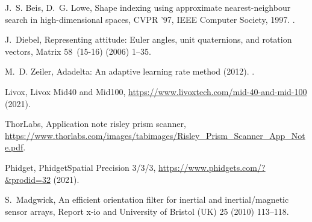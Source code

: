 \documentclass[5p]{elsarticle}
\begin{document}
\begin{thebibliography}{10}
J.~S. Beis, D.~G. Lowe, Shape indexing using approximate nearest-neighbour
  search in high-dimensional spaces, CVPR '97, IEEE Computer Society, 1997.
\newblock \href {http://dx.doi.org/10.1109/CVPR.1997.609451}
  {}.

J.~Diebel, Representing attitude: Euler angles, unit quaternions, and rotation
  vectors, Matrix 58~(15-16) (2006) 1--35.

M.~D. Zeiler, Adadelta: An adaptive learning rate method (2012).
\newblock \href {http://arxiv.org/abs/1212.5701} {}.

Livox, {Livox Mid40 and Mid100},
  \url{https://www.livoxtech.com/mid-40-and-mid-100} (2021).

ThorLabs, Application note risley prism scanner,
  \url{https://www.thorlabs.com/images/tabimages/Risley_Prism_Scanner_App_Note.pdf}.

Phidget, {PhidgetSpatial Precision 3/3/3},
  \url{https://www.phidgets.com/?&prodid=32} (2021).

S.~Madgwick, An efficient orientation filter for inertial and inertial/magnetic
  sensor arrays, Report x-io and University of Bristol (UK) 25 (2010) 113--118.

\end{thebibliography}
\end{document}
